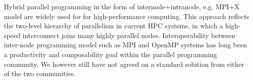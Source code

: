 Hybrid parallel programming in the form of internode+intranode, e.g. MPI+X model are widely used for 
for high-performance computing. This approach reflects the two-level hierarchy of parallelism in current HPC systems, 
in which a high-speed interconnect
joins many highly parallel nodes.
Interoperability between inter-node programming model such as MPI and OpenMP 
systems has long been a productivity and composability goal within
the parallel programming community. We however still have not agreed on a standard solution from either of the two communities. 


